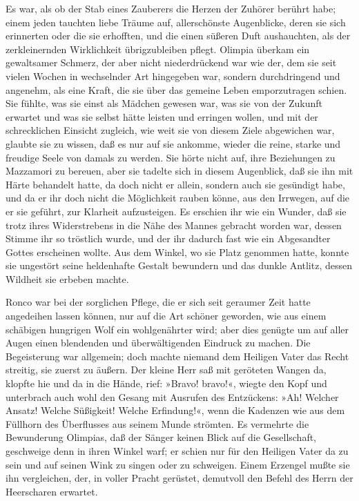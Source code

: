 \pagenum{[85]} Es war, als ob der Stab eines Zauberers die Herzen
der Zuhörer berührt habe; einem jeden tauchten liebe Träume auf,
allerschönste Augenblicke, deren sie sich erinnerten oder die sie
erhofften, und die einen süßeren Duft aushauchten, als der
zerkleinernden Wirklichkeit übrigzubleiben pflegt. Olimpia überkam
ein gewaltsamer Schmerz, der aber nicht niederdrückend war wie der,
dem sie seit vielen Wochen in wechselnder Art hingegeben war,
sondern durchdringend und angenehm, als eine Kraft, die sie über
das gemeine Leben emporzutragen schien. Sie fühlte, was sie einst
als Mädchen gewesen war, was sie von der Zukunft erwartet und was
sie selbst hätte leisten und erringen wollen, und mit der
schrecklichen Einsicht zugleich, wie weit sie von diesem Ziele
abgewichen war, glaubte sie zu wissen, daß es nur auf sie ankomme,
wieder die reine, starke und freudige Seele von damals zu werden.
Sie hörte nicht auf, ihre Beziehungen zu Mazzamori zu bereuen, aber
sie tadelte sich in diesem Augenblick, daß sie ihn mit Härte
behandelt hatte, da doch nicht er allein, sondern auch sie
gesündigt habe, und da er ihr doch nicht die Möglichkeit rauben
könne, aus den Irrwegen, auf die er sie geführt, zur Klarheit
aufzusteigen. Es erschien ihr wie ein Wunder, daß sie trotz ihres
Widerstrebens in die Nähe des Mannes gebracht worden war, dessen
Stimme ihr so tröstlich wurde, und der ihr dadurch fast wie ein
Abgesandter Gottes erscheinen wollte. Aus dem Winkel, wo sie Platz
genommen hatte, konnte sie ungestört seine heldenhafte Gestalt
bewundern und das dunkle Antlitz, dessen Wildheit sie erbeben
machte.

Ronco war bei der sorglichen Pflege, die er sich seit geraumer Zeit
hatte angedeihen lassen können, nur auf die Art schöner geworden,
wie aus einem schäbigen hungrigen \pagenum{[86]} Wolf ein
wohlgenährter wird; aber dies genügte um auf aller Augen einen
blendenden und überwältigenden Eindruck zu machen. Die Begeisterung
war allgemein; doch machte niemand dem Heiligen Vater das Recht
streitig, sie zuerst zu äußern. Der kleine Herr saß mit geröteten
Wangen da, klopfte hie und da in die Hände, rief: »Bravo! bravo!«,
wiegte den Kopf und unterbrach auch wohl den Gesang mit Ausrufen
des Entzückens: »Ah! Welcher Ansatz! Welche Süßigkeit! Welche
Erfindung!«, wenn die Kadenzen wie aus dem Füllhorn des Überflusses
aus seinem Munde strömten. Es vermehrte die Bewunderung Olimpias,
daß der Sänger keinen Blick auf die Gesellschaft, geschweige denn
in ihren Winkel warf; er schien nur für den Heiligen Vater da zu
sein und auf seinen Wink zu singen oder zu schweigen. Einem
Erzengel mußte sie ihn vergleichen, der, in voller Pracht gerüstet,
demutvoll den Befehl des Herrn der Heerscharen erwartet.

